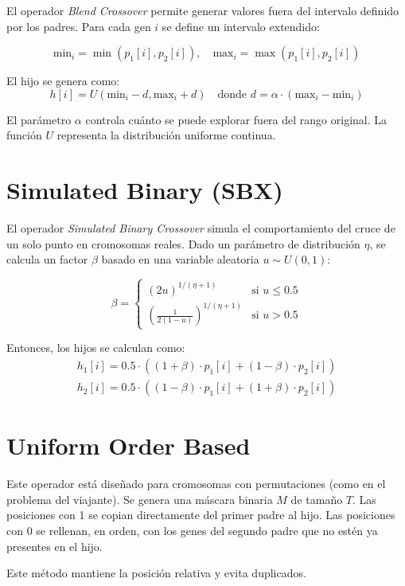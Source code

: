 El operador \textit{Blend Crossover} permite generar valores fuera del intervalo definido por los padres. Para cada gen $i$ se define un intervalo extendido:

\[
\text{min}_i = \min(p_1[i], p_2[i]), \quad
\text{max}_i = \max(p_1[i], p_2[i])
\]

El hijo se genera como:
\[
h[i] = U\left( \text{min}_i - d, \text{max}_i + d \right)
\quad \text{donde } d = \alpha \cdot (\text{max}_i - \text{min}_i)
\]

El parámetro $\alpha$ controla cuánto se puede explorar fuera del rango original. La función $U$ representa la distribución uniforme continua.

\section{Simulated Binary (SBX)}

El operador \textit{Simulated Binary Crossover} simula el comportamiento del cruce de un solo punto en cromosomas reales. Dado un parámetro de distribución $\eta$, se calcula un factor $\beta$ basado en una variable aleatoria $u \sim U(0,1)$:

\[
\beta = \begin{cases}
	(2u)^{1/(\eta + 1)} & \text{si } u \leq 0.5 \\
	\left( \frac{1}{2(1 - u)} \right)^{1/(\eta + 1)} & \text{si } u > 0.5
\end{cases}
\]

Entonces, los hijos se calculan como:
\begin{gather*}
	h_1[i] = 0.5 \cdot \left( (1 + \beta) \cdot p_1[i] + (1 - \beta) \cdot p_2[i] \right) \\
	h_2[i] = 0.5 \cdot \left( (1 - \beta) \cdot p_1[i] + (1 + \beta) \cdot p_2[i] \right)
\end{gather*}

\section{Uniform Order Based}

Este operador está diseñado para cromosomas con permutaciones (como en el problema del viajante). Se genera una máscara binaria $M$ de tamaño $T$. Las posiciones con 1 se copian directamente del primer padre al hijo. Las posiciones con 0 se rellenan, en orden, con los genes del segundo padre que no estén ya presentes en el hijo.

Este método mantiene la posición relativa y evita duplicados.

